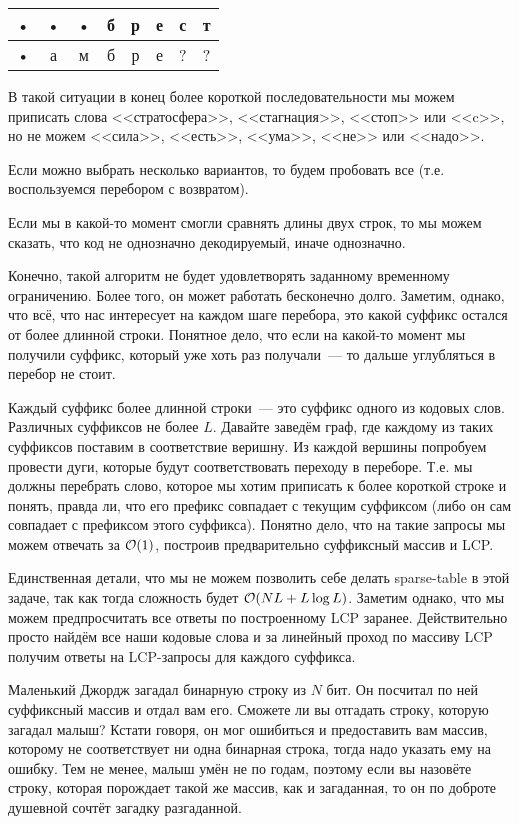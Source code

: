 \documentclass[addpoints]{exam}
\begin{document}
\begin{questions}
\begin{solution}
\begin{center}
\begin{tabular}{|c|c|c|c|c|c|c|c|}
 \hline 
 • & • & • & б & р & е & с & т \\ 
 \hline 
 • & а & м & б & р & е & ? & ? \\ 
 \hline 
 \end{tabular}  
\end{center}

В такой ситуации в конец более короткой последовательности мы можем приписать слова <<стратосфера>>, <<стагнация>>, <<стоп>> или <<c>>, но не можем <<сила>>, <<есть>>, <<ума>>, <<не>> или <<надо>>.

Если можно выбрать несколько вариантов, то будем пробовать все (т.е. воспользуемся перебором с возвратом).

Если мы в какой-то момент смогли сравнять длины двух строк, то мы можем сказать, что код не однозначно декодируемый, иначе однозначно.

Конечно, такой алгоритм не будет удовлетворять заданному временному ограничению. Более того, он может работать бесконечно долго. Заметим, однако, что всё, что нас интересует на каждом шаге перебора, это какой суффикс остался от более длинной строки. Понятное дело, что если на какой-то момент мы получили суффикс, который уже хоть раз получали~--- то дальше углубляться в перебор не стоит.

Каждый суффикс более длинной строки~--- это суффикс одного из кодовых слов. Различных суффиксов не более $L$. Давайте заведём граф, где каждому из таких суффиксов поставим в соответствие веришну. Из каждой вершины попробуем провести дуги, которые будут соответствовать переходу в переборе. Т.е. мы должны перебрать слово, которое мы хотим приписать к более короткой строке и понять, правда ли, что его префикс совпадает с текущим суффиксом (либо он сам совпадает с префиксом этого суффикса). Понятно дело, что на такие запросы мы можем отвечать за $\mathcal{O}(1)$, построив предварительно суффиксный массив и LCP.

Единственная детали, что мы не можем позволить себе делать sparse-table в этой задаче, так как тогда сложность будет $\mathcal{O}(NL + L \log L)$. Заметим однако, что мы можем предпросчитать все ответы по построенному LCP заранее. Действительно просто найдём все наши кодовые слова и за линейный проход по массиву LCP получим ответы на  LCP-запросы для каждого суффикса.

\end{solution}

\question[1] Маленький Джордж загадал бинарную строку из $N$ бит. Он посчитал по ней суффиксный массив и отдал вам его. Сможете ли вы отгадать строку, которую загадал малыш? Кстати говоря, он мог ошибиться и предоставить вам массив, которому не соответствует ни одна бинарная строка, тогда надо указать ему на ошибку. Тем не менее, малыш умён не по годам, поэтому если вы назовёте строку, которая порождает такой же массив, как и загаданная, то он по доброте душевной сочтёт загадку разгаданной.


\end{questions}
\end{document}
